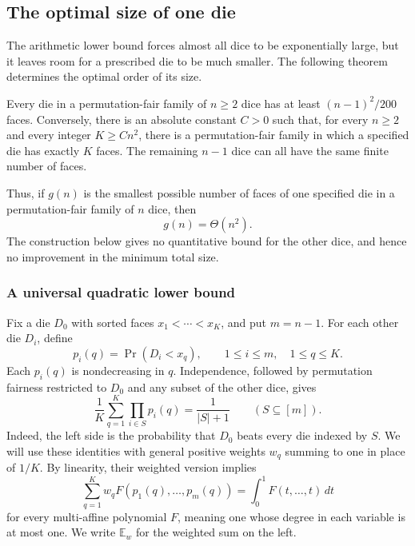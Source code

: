 \subsection{The optimal size of one die}\label{individual-section}

The arithmetic lower bound forces almost all dice to be exponentially
large, but it leaves room for a prescribed die to be much smaller.  The
following theorem determines the optimal order of its size.

\begin{theorem}\label{thm:individual-size}
Every die in a permutation-fair family of \(n\geq2\) dice has at least
\((n-1)^2/200\) faces.  Conversely, there is an absolute constant \(C>0\)
such that, for every \(n\geq2\) and every integer \(K\geq Cn^2\), there
is a permutation-fair family in which a specified die has exactly \(K\)
faces.  The remaining \(n-1\) dice can all have the same finite number of
faces.
\end{theorem}

Thus, if \(g(n)\) is the smallest possible number of faces of one
specified die in a permutation-fair family of \(n\) dice, then
\[
  g(n)=\Theta(n^2).
\]
The construction below gives no quantitative bound for the other dice,
and hence no improvement in the minimum total size.

\subsubsection{A universal quadratic lower bound}

Fix a die \(D_0\) with sorted faces \(x_1<\cdots<x_K\), and put
\(m=n-1\).  For each other die \(D_i\), define
\[
  p_i(q)=\Pr(D_i<x_q),\qquad 1\leq i\leq m,\quad 1\leq q\leq K.
\]
Each \(p_i(q)\) is nondecreasing in \(q\).  Independence, followed by
permutation fairness restricted to \(D_0\) and any subset of the other
dice, gives
\begin{equation}\label{individual-comparison-moments}
  \frac1K\sum_{q=1}^K\prod_{i\in S}p_i(q)=\frac1{|S|+1}
  \qquad(S\subseteq[m]).
\end{equation}
Indeed, the left side is the probability that \(D_0\) beats every die
indexed by \(S\).  We will use these identities with general positive
weights \(w_q\) summing to one in place of \(1/K\).  By linearity,
their weighted version implies
\begin{equation}\label{individual-diagonal-identity}
  \sum_{q=1}^K w_q F(p_1(q),\ldots,p_m(q))
  =\int_0^1 F(t,\ldots,t)\,dt
\end{equation}
for every multi-affine polynomial \(F\), meaning one whose degree in
each variable is at most one.  We write \(\mathbb E_w\) for the weighted
sum on the left.

